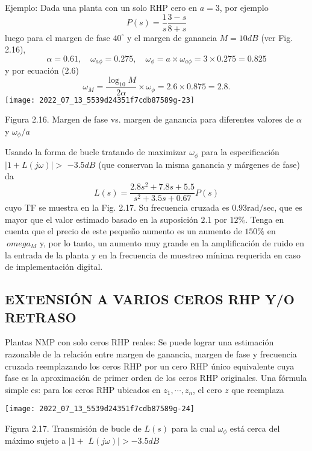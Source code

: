 Ejemplo: Dada una planta con un solo RHP cero en $a=3$, por ejemplo
$$
P(s)=\frac{1}{s} \frac{3-s}{8+s}
$$
luego para el margen de fase $40^{\circ}$ y el margen de ganancia $M=10 d B$ (ver Fig. 2.16),
$$
\alpha=0.61, \quad \omega_{a \phi}=0.275, \quad \omega_{\phi}=a \times \omega_{a \phi}=3 \times 0.275=0.825
$$
y por ecuación (2.6)
$$
\omega_{M}=\frac{\log _{10} M}{2 \alpha} \times \omega_{\phi}=2.6 \times 0.875=2.8 .
$$
\texttt{[image: 2022\_07\_13\_5539d24351f7cdb87589g-23]}

Figura 2.16. Margen de fase vs. margen de ganancia para diferentes valores de $\alpha$ y $\omega_{\phi} / a$

Usando la forma de bucle tratando de maximizar $\omega_{\phi}$ para la especificación $|1+L(j \omega)|>$ $-3.5 d B$ (que conservan la misma ganancia y márgenes de fase) da
$$
L(s)=\frac{2.8 s^{2}+7.8 s+5.5}{s^{2}+3.5 s+0.67} P(s)
$$
cuyo TF se muestra en la Fig. 2.17. Su frecuencia cruzada es $0.93 \mathrm{rad} / \mathrm{sec}$, que es mayor que el valor estimado basado en la suposición $2.1$ por $12 \%$. Tenga en cuenta que el precio de este pequeño aumento es un aumento de $ 150 \%$ en $ \ omega_ {M}$ y, por lo tanto, un aumento muy grande en la amplificación de ruido en la entrada de la planta y en la frecuencia de muestreo mínima requerida en caso de implementación digital.

\subsection{EXTENSIÓN A VARIOS CEROS RHP Y/O RETRASO}
Plantas NMP con solo ceros RHP reales: Se puede lograr una estimación razonable de la relación entre margen de ganancia, margen de fase y frecuencia cruzada reemplazando los ceros RHP por un cero RHP único equivalente cuya fase es la aproximación de primer orden de los ceros RHP originales. Una fórmula simple es: para los ceros RHP ubicados en $z_{1}, \cdots, z_{n}$, el cero $z$ que reemplaza

\texttt{[image: 2022\_07\_13\_5539d24351f7cdb87589g-24]}

Figura 2.17. Transmisión de bucle de $L(s)$ para la cual $\omega_{\phi}$ está cerca del máximo sujeto a $\mid 1+$ $L(j \omega) \mid>-3.5 d B$

